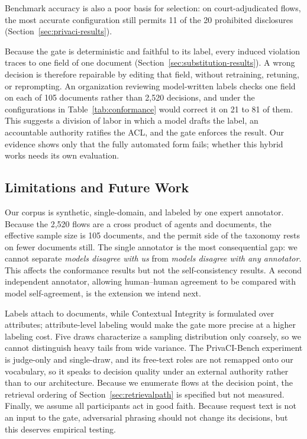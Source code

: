 {Benchmark accuracy is also a poor basis for selection: on court-adjudicated
flows, the most accurate configuration still permits 11 of the 20 prohibited
disclosures (Section~\ref{sec:privaci-results}).

Because the gate is deterministic and faithful to its label, every induced
violation traces to one field of one document
(Section~\ref{sec:substitution-results}). A wrong decision is therefore
repairable by editing that field, without retraining, retuning, or
reprompting. An organization reviewing model-written labels checks one field
on each of 105 documents rather than 2,520 decisions, and under the
configurations in Table~\ref{tab:conformance} would correct it on 21 to 81 of
them. This suggests a division of labor in which a model drafts the label, an
accountable authority ratifies the ACL, and the gate enforces the result. Our
evidence shows only that the fully automated form fails; whether this hybrid
works needs its own evaluation.

\subsection{Limitations and Future Work}
\label{sec:future}
Our corpus is synthetic, single-domain, and labeled by one expert annotator.
Because the 2,520 flows are a cross product of agents and documents, the
effective sample size is 105 documents, and the permit side of the
taxonomy rests on fewer documents still. The single annotator is the most
consequential gap: we cannot separate \emph{models disagree with us} from
\emph{models disagree with any annotator}. This affects the conformance results
but not the self-consistency results. A second independent annotator, allowing
human--human agreement to be compared with model self-agreement, is the
extension we intend next.

Labels attach to documents, while Contextual Integrity is formulated over
attributes; attribute-level labeling would make the gate more precise at a
higher labeling cost. Five draws characterize a sampling distribution only
coarsely, so we cannot distinguish heavy tails from wide variance. The
PrivaCI-Bench experiment is judge-only and single-draw, and its free-text roles
are not remapped onto our vocabulary, so it speaks to decision quality under
an external authority rather than to our architecture. Because we enumerate
flows at the decision point, the retrieval ordering of
Section~\ref{sec:retrievalpath} is specified but not measured. Finally, we
assume all participants act in good faith. Because request text is not an
input to the gate, adversarial phrasing should not change its decisions, but
this deserves empirical testing.

}
